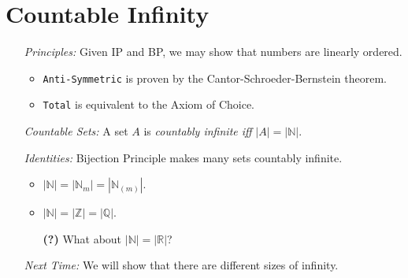 \documentclass[a4paper, 11pt]{article} %
\newcommand{\abs}[1]{|#1|} %
\newcommand{\N}{\mathbb{N}}
\newcommand{\Z}{\mathbb{Z}}
\newcommand{\Q}{\mathbb{Q}}
\newcommand{\R}{\mathbb{R}}
\begin{document}
\section*{Countable Infinity}

\begin{enumerate}
  \item[\it Principles:] Given IP and BP, we may show that numbers are linearly ordered.
    \begin{itemize}[leftmargin=-.2in]
      \item \texttt{Anti-Symmetric} is proven by the Cantor-Schroeder-Bernstein theorem.
      \item \texttt{Total} is equivalent to the Axiom of Choice.
    \end{itemize}
  \item[\it Countable Sets:] A set $A$ is \textit{countably infinite iff} $\abs{A}=\abs{\N}$.
  \item[\it Identities:] Bijection Principle makes many sets countably infinite.
    \begin{itemize}[leftmargin=-.2in]
      \item $\abs{\N} = \abs{\N_m} = \abs{\N_{(m)}}$.  
      \item $\abs{\N} = \abs{\Z} = \abs{\Q}$.
      \item[\bf (?)] What about $\abs{\N} = \abs{\R}$?
    \end{itemize}
  \item[\it Next Time:] We will show that there are different sizes of infinity.
\end{enumerate}
\end{document}
